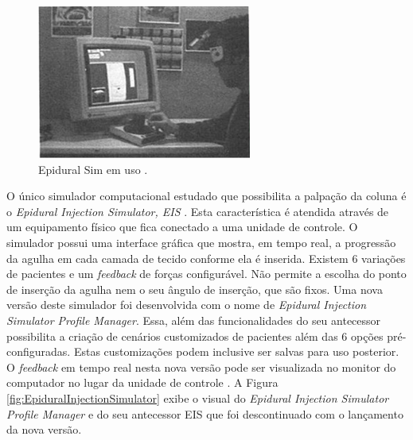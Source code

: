 \begin{figure}[ht!]
    \centering
    \includegraphics[width=0.3\linewidth]{capitulos/figuras/epiduralSimulator.png} 
    \caption{Epidural Sim em uso \cite{Stredney1996}.}
    \label{fig:epiduralSim}
\end{figure}

O único simulador computacional estudado que possibilita a palpação da coluna é o \textit{Epidural Injection Simulator, EIS} \cite{Wilson2003}. Esta característica é atendida através de um equipamento físico que fica conectado a uma unidade de controle. O simulador possui uma interface gráfica que mostra, em tempo real, a progressão da agulha em cada camada de tecido conforme ela é inserida. Existem 6 variações de pacientes e um \textit{feedback} de forças configurável. Não permite a escolha do ponto de inserção da agulha nem o seu ângulo de inserção, que são fixos. Uma nova versão deste simulador foi desenvolvida com o nome de \textit{Epidural Injection Simulator Profile Manager}. Essa, além das funcionalidades do seu antecessor possibilita a criação de cenários customizados de pacientes além das 6 opções pré-configuradas. Estas customizações podem inclusive ser salvas para uso posterior. O \textit{feedback} em tempo real nesta nova versão pode ser visualizada no monitor do computador no lugar da unidade de controle \cite{CPRSavers&FirstAidSupply2018}. A Figura \ref{fig:EpiduralInjectionSimulator} exibe o visual do \textit{Epidural Injection Simulator Profile Manager} e do seu antecessor EIS que foi descontinuado com o lançamento da nova versão.

